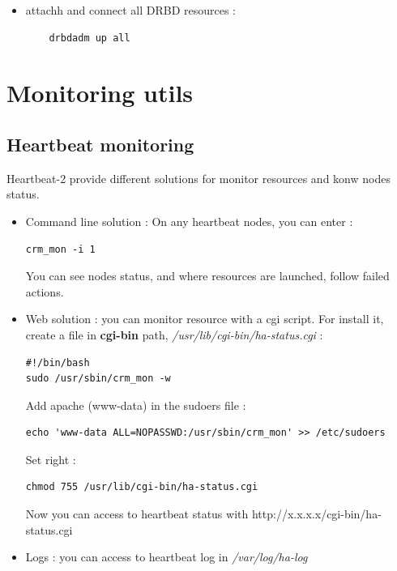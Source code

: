 \documentclass[a4paper,10pt]{report}
\begin{document}
\begin{itemize}
 \item attachh and connect all DRBD resources :
    \begin{lstlisting}
    drbdadm up all
    \end{lstlisting}

\end{itemize}




\section{Monitoring utils}

\subsection{Heartbeat monitoring}
\label{hb-monitor}
Heartbeat-2 provide different solutions for monitor resources and konw nodes status.
\begin{itemize}
 \item Command line solution : On any heartbeat nodes, you can enter :
\begin{lstlisting}
crm_mon -i 1
\end{lstlisting}
You can see nodes status, and where resources are launched, follow failed actions.
\item Web solution : you can monitor resource with a cgi script. For install it, create a file in \textbf{cgi-bin} path, \textit{/usr/lib/cgi-bin/ha-status.cgi} :
\begin{lstlisting}
#!/bin/bash
sudo /usr/sbin/crm_mon -w
\end{lstlisting}
Add apache (www-data) in the sudoers file :
\begin{lstlisting}
echo 'www-data ALL=NOPASSWD:/usr/sbin/crm_mon' >> /etc/sudoers
\end{lstlisting}
Set right :
\begin{lstlisting}
chmod 755 /usr/lib/cgi-bin/ha-status.cgi
\end{lstlisting}
Now you can access to heartbeat status with http://x.x.x.x/cgi-bin/ha-status.cgi
\item Logs : you can access to heartbeat log in \textit{/var/log/ha-log}

\end{itemize}
\end{document}
